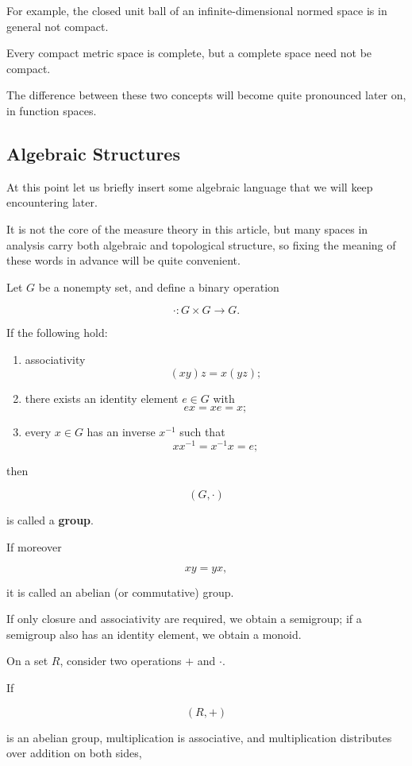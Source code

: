 \documentclass[11pt]{article}
\begin{document}
For example, the closed unit ball of an infinite-dimensional normed space is in general not compact.

Every compact metric space is complete, but a complete space need not be compact.

The difference between these two concepts will become quite pronounced later on, in function spaces.

\subsection{Algebraic Structures}

At this point let us briefly insert some algebraic language that we will keep encountering later.

It is not the core of the measure theory in this article, but many spaces in analysis carry both algebraic and topological structure, so fixing the meaning of these words in advance will be quite convenient.

Let $G$ be a nonempty set, and define a binary operation

\[
\cdot:G\times G\rightarrow G.
\]

If the following hold:

\begin{enumerate}
  \item associativity
  \[
  (xy)z=x(yz);
  \]
  \item there exists an identity element $e\in G$ with
  \[
  ex=xe=x;
  \]
  \item every $x\in G$ has an inverse $x^{-1}$ such that
  \[
  xx^{-1}=x^{-1}x=e;
  \]
\end{enumerate}

then

\[
(G,\cdot)
\]

is called a \textbf{group}.

If moreover

\[
xy=yx,
\]

it is called an abelian (or commutative) group.

If only closure and associativity are required, we obtain a semigroup; if a semigroup also has an identity element, we obtain a monoid.

On a set $R$, consider two operations $+$ and $\cdot$.

If

\[
(R,+)
\]

is an abelian group, multiplication is associative, and multiplication distributes over addition on both sides,
\end{document}
